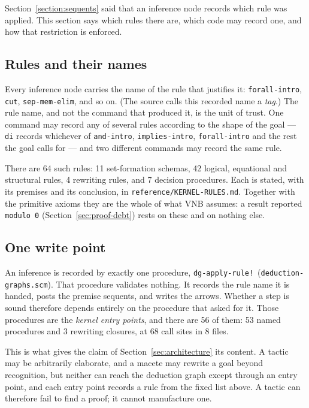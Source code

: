 Section~\ref{section:sequents} said that an inference node records which
rule was applied.  This section says which rules there are, which code
may record one, and how that restriction is enforced.

\subsection{Rules and their names}

Every inference node carries the name of the rule that justifies it:
\texttt{forall-intro}, \texttt{cut}, \texttt{sep-mem-elim}, and so on.
(The source calls this recorded name a \emph{tag}.)  The rule name, and
not the command that produced it, is the unit of trust.  One command may
record any of several rules according to the shape of the goal ---
\texttt{di} records whichever of \texttt{and-intro},
\texttt{implies-intro}, \texttt{forall-intro} and the rest the goal calls
for --- and two different commands may record the same rule.

There are 64 such rules: 11 set-formation schemas, 42 logical,
equational and structural rules, 4 rewriting rules, and 7 decision
procedures.  Each is stated, with its premises and its conclusion, in
\texttt{reference/KERNEL-RULES.md}.  Together with the primitive axioms
they are the whole of what VNB assumes: a result reported \texttt{modulo
0} (Section~\ref{sec:proof-debt}) rests on these and on nothing else.

\subsection{One write point}

An inference is recorded by exactly one procedure,
\texttt{dg-apply-rule!}\ (\texttt{deduction-graphs.scm}).  That procedure
validates nothing.  It records the rule name it is handed, posts the
premise sequents, and writes the arrows.  Whether a step is sound
therefore depends entirely on the procedure that asked for it.  Those
procedures are the \emph{kernel entry points}, and there are 56 of them:
53 named procedures and 3 rewriting closures, at 68 call sites in 8
files.

This is what gives the claim of Section~\ref{sec:architecture} its
content.  A tactic may be arbitrarily elaborate, and a macete may rewrite
a goal beyond recognition, but neither can reach the deduction graph
except through an entry point, and each entry point records a rule from
the fixed list above.  A tactic can therefore fail to find a proof; it
cannot manufacture one.

